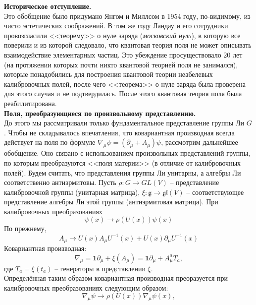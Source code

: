 \documentclass[12pt]{article}
\theoremstyle{definition}
\begin{document}
\textbf{Историческое отступление.}\\
Это обобщение было придумано Янгом и Миллсом в 1954 году, по-видимому, из чисто эстетических соображений. В том же году Ландау и его сотрудники провозгласили <<теорему>> о нуле заряда (\textit{московский нуль}), в которую все поверили и из которой следовало, что квантовая теория поля не может описывать взаимодействие элементарных частиц. Это убеждение просуществовало 20 лет (на протяжении которых почти никто квантовой теорией поля не занимался), которые понадобились для построения квантовой теории неабелевых калибровочных полей, после чего <<теорема>> о нуле заряда была проверена для этого случая и не подтвердилась. После этого квантовая теория поля была реабилитирована.\\
\textbf{Поля, преобразующиеся по произвольному представлению.}\\
До этого мы рассматривали только фундаментальное представление группы Ли $G$. Чтобы не складывалось впечатления, что ковариантная производная всегда действует на поля по формуле $\nabla_\mu\psi=(\partial_\mu+A_\mu)\psi$, рассмотрим дальнейшее обобщение. Оно связано с использованием произвольных представлений группы, по которым преобразуются <<поля материи>> (в отличие от калибровочных полей). Будем считать, что представления группы Ли унитарны, а алгебры Ли соответственно антиэрмитовы. Пусть $\rho:G\rightarrow GL(V)$ -- представление калибровочной группы (унитарная матрица), $\xi:\mathfrak{g}\rightarrow\mathfrak{gl}(V)$ -- соответствующее представление алгебры Ли этой группы (антиэрмитовая матрица). При калибровочных преобразованиях
\begin{equation}
    \psi(x)\rightarrow \rho(U(x))\psi(x)
\end{equation}
По прежнему,
\begin{equation}
    A_\mu\rightarrow U(x)A_\mu U^{-1}(x)+U(x)\partial_\mu U^{-1}(x)
\end{equation}
Ковариантная производная:
\begin{equation}\label{eq4}
    \nabla_\mu=\bm{1}\partial_\mu+\xi(A_\mu)=\bm{1}\partial_\mu+A^a_\mu T_a,
\end{equation}
где $T_a=\xi(t_a)$ -- генераторы в представлении $\xi$.\\
Определённая таким образом ковариантная производная преоразуется при калибровочных преобразованиях следующим образом:
\begin{equation}
    \nabla_\mu\psi\rightarrow \rho(U(x))\nabla_\mu\psi(x),
\end{equation}
\end{document}
